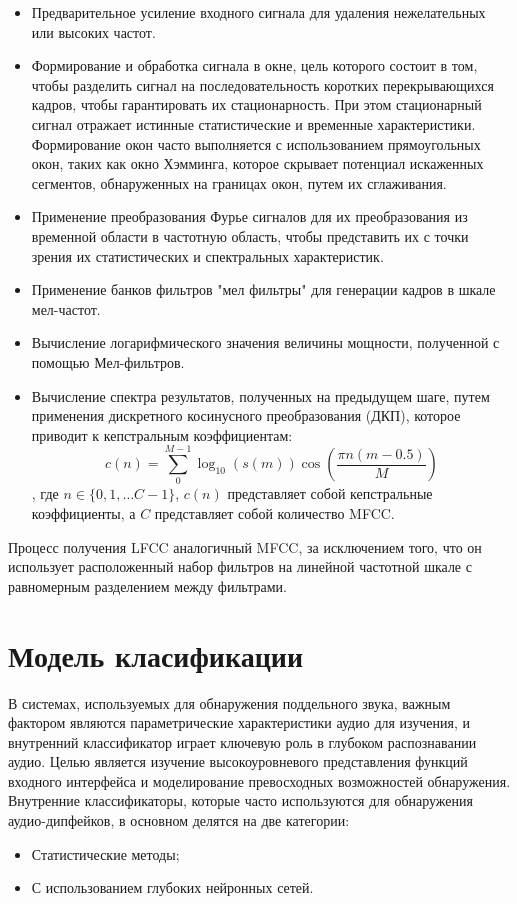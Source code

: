 \begin{itemize}
    \item Предварительное усиление входного сигнала для удаления нежелательных или высоких частот.
    \item Формирование и обработка сигнала в окне, цель которого состоит в том, чтобы разделить сигнал на последовательность коротких перекрывающихся кадров, чтобы гарантировать их стационарность. При этом стационарный сигнал отражает истинные статистические и временные характеристики. Формирование окон часто выполняется с использованием прямоугольных окон, таких как окно Хэмминга, которое скрывает потенциал искаженных сегментов, обнаруженных на границах окон, путем их сглаживания.
    \item Применение преобразования Фурье сигналов для их преобразования из временной области в частотную область, чтобы представить их с точки зрения их статистических и спектральных характеристик.
    \item Применение банков фильтров "мел фильтры" для генерации кадров в шкале мел-частот.
    \item Вычисление логарифмического значения величины мощности, полученной с помощью Мел-фильтров.
    \item Вычисление спектра результатов, полученных на предыдущем шаге, путем применения дискретного косинусного преобразования (ДКП), которое приводит к кепстральным коэффициентам: \begin{equation} c(n) = \sum_{0}^{M - 1} \log_{10}(s(m)) \cos(\frac{\pi n (m - 0.5)}{M})\end{equation}, где \(n \in \{0, 1, \dots C-1\}\), \(c(n)\) представляет собой кепстральные коэффициенты, а \(C\) представляет собой количество MFCC.
\end{itemize}

Процесс получения LFCC аналогичный MFCC, за исключением того, что он использует расположенный набор фильтров на линейной частотной шкале с равномерным разделением между фильтрами.

\section{Модель класификации}

В системах, используемых для обнаружения поддельного звука, важным фактором являются параметрические характеристики аудио для изучения, и внутренний классификатор играет ключевую роль в глубоком распознавании аудио. Целью является изучение высокоуровневого представления функций входного интерфейса и моделирование превосходных возможностей обнаружения. Внутренние классификаторы, которые часто используются для обнаружения аудио-дипфейков, в основном делятся на две категории:
\begin{itemize}
    \item Статистические методы;
    \item С использованием глубоких нейронных сетей.
\end{itemize}

